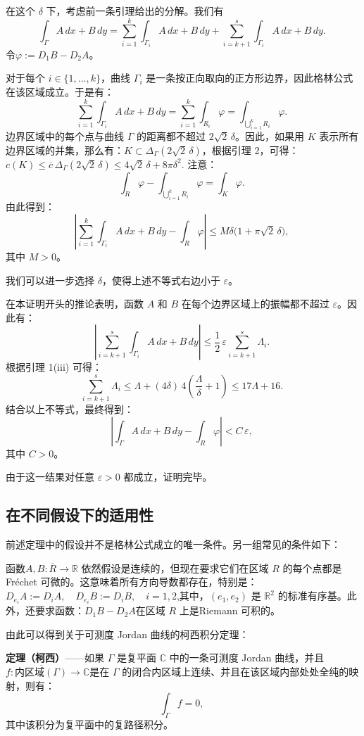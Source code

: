 在这个 $\delta$ 下，考虑前一条引理给出的分解。我们有
$$
\int_{\Gamma} A\,dx + B\,dy 
= \sum_{i=1}^{k} \int_{\Gamma_i} A\,dx + B\,dy 
+ \sum_{i=k+1}^{s} \int_{\Gamma_i} A\,dx + B\,dy.~
$$
令$\varphi := D_1 B - D_2 A$。

对于每个 $i \in \{1, \ldots, k\}$，曲线 $\Gamma_i$ 是一条按正向取向的正方形边界，因此格林公式在该区域成立。于是有：
$$
\sum_{i=1}^{k} \int_{\Gamma_i} A\,dx + B\,dy 
= 
\sum_{i=1}^{k} \int_{R_i} \varphi
= 
\int_{\bigcup_{i=1}^{k} R_i} \varphi.~
$$
边界区域中的每个点与曲线 $\Gamma$ 的距离都不超过 $2\sqrt{2}\,\delta$。因此，如果用 $K$ 表示所有边界区域的并集，那么有：$K \subset \Delta_{\Gamma}(2\sqrt{2}\,\delta)$，根据引理 2，可得：$c(K) \leq \overline{c}\,\Delta_{\Gamma}(2\sqrt{2}\,\delta)\leq 4\sqrt{2}\,\delta + 8\pi\delta^2$.
注意：
$$
\int_{R} \varphi - \int_{\bigcup_{i=1}^{k} R_i} \varphi
= 
\int_{K} \varphi.~
$$
由此得到：
$$
\left| 
\sum_{i=1}^{k} \int_{\Gamma_i} A\,dx + B\,dy 
- 
\int_{R} \varphi 
\right|
\leq 
M\delta \bigl(1 + \pi\sqrt{2}\,\delta \bigr),~
$$
其中 $M > 0$。

我们可以进一步选择 $\delta$，使得上述不等式右边小于 $\varepsilon$。

在本证明开头的推论表明，函数 $A$ 和 $B$ 在每个边界区域上的振幅都不超过 $\varepsilon$。因此有：
$$
\left| 
\sum_{i=k+1}^{s} \int_{\Gamma_i} A\,dx + B\,dy
\right|
\leq 
\frac{1}{2}\,\varepsilon
\sum_{i=k+1}^{s} \Lambda_i .~
$$
根据引理 1(iii) 可得：
$$
\sum_{i=k+1}^{s} \Lambda_i
\leq 
\Lambda + (4\delta)\,4\!\left(\frac{\Lambda}{\delta} + 1\right)
\leq 
17\Lambda + 16.~
$$
结合以上不等式，最终得到：
$$
\left| 
\int_{\Gamma} A\,dx + B\,dy
-
\int_{R} \varphi
\right|
< 
C\,\varepsilon ,~
$$
其中 $C > 0$。

由于这一结果对任意 $\varepsilon > 0$ 都成立，证明完毕。
\subsection{在不同假设下的适用性}
前述定理中的假设并不是格林公式成立的唯一条件。另一组常见的条件如下：

函数$A, B : \overline{R} \to \mathbb{R}$ 依然假设是连续的，但现在要求它们在区域 $R$ 的每个点都是Fréchet 可微的。这意味着所有方向导数都存在，特别是：$D_{e_i} A := D_i A, \quad D_{e_i} B := D_i B, \quad i = 1, 2$,其中，$(e_1, e_2)$ 是 $\mathbb{R}^2$ 的标准有序基。此外，还要求函数：$D_1 B - D_2 A$在区域 $R$ 上是Riemann 可积的。

由此可以得到关于可测度 Jordan 曲线的柯西积分定理：

\textbf{定理（柯西）}——如果 $\Gamma$ 是复平面 $\mathbb{C}$ 中的一条可测度 Jordan 曲线，并且$f : \overline{\text{内区域}(\Gamma)} \to \mathbb{C}$是在 $\Gamma$ 的闭合内区域上连续、并且在该区域内部处处全纯的映射，则有：
$$
\int_{\Gamma} f = 0,~
$$
其中该积分为复平面中的复路径积分。
